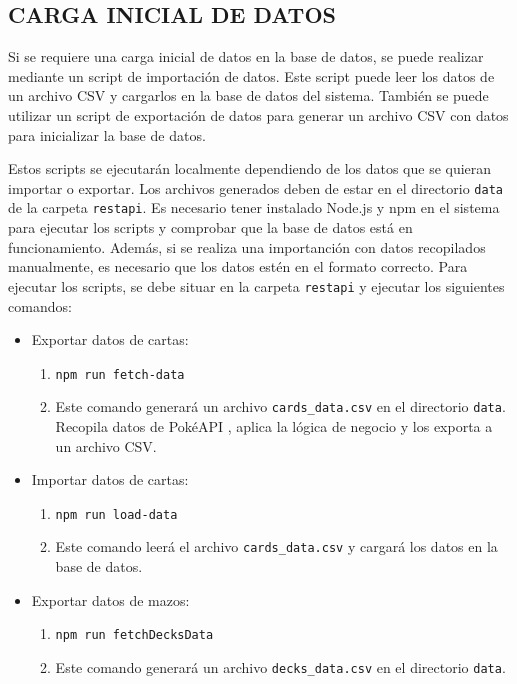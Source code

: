 \begin{enumerate}
\newpage
\section{CARGA INICIAL DE DATOS}
Si se requiere una carga inicial de datos en la base de datos, se puede realizar mediante un script de importación de datos.
Este script puede leer los datos de un archivo CSV y cargarlos en la base de datos del sistema.
También se puede utilizar un script de exportación de datos para generar un archivo CSV con datos para inicializar la base de datos.

Estos scripts se ejecutarán localmente dependiendo de los datos que se quieran importar o exportar.
Los archivos generados deben de estar en el directorio \texttt{data} de la carpeta \texttt{restapi}.
Es necesario tener instalado Node.js y npm en el sistema para ejecutar los scripts y comprobar que la base de datos está en funcionamiento.
Además, si se realiza una importanción con datos recopilados manualmente, es necesario que los datos estén en el formato correcto.
Para ejecutar los scripts, se debe situar en la carpeta \texttt{restapi} y ejecutar los siguientes comandos:
\begin{itemize}
    \item Exportar datos de cartas:
    \begin{enumerate}
        \item \texttt{npm run fetch-data}
        \item Este comando generará un archivo \texttt{cards\_data.csv} en el directorio \texttt{data}. Recopila datos de PokéAPI
        , aplica la lógica de negocio y los exporta a un archivo CSV.
    \end{enumerate}
    \item Importar datos de cartas:
    \begin{enumerate}
        \item \texttt{npm run load-data}
        \item Este comando leerá el archivo \texttt{cards\_data.csv} y cargará los datos en la base de datos.
    \end{enumerate}
    \item Exportar datos de mazos:
    \begin{enumerate}
        \item \texttt{npm run fetchDecksData}
        \item Este comando generará un archivo \texttt{decks\_data.csv} en el directorio \texttt{data}.

\end{enumerate}
\end{itemize}
\end{enumerate}
